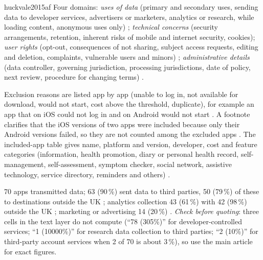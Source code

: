 \begin{papercard}{huckvale2015af}
 Four domains: \emph{uses of data} (primary and secondary uses, sending data to developer services, advertisers or marketers, analytics or research, while loading content, anonymous uses only) ; \emph{technical concerns} (security arrangements, retention, inherent risks of mobile and internet security, cookies); \emph{user rights} (opt-out, consequences of not sharing, subject access requests, editing and deletion, complaints, vulnerable users and minors) ; \emph{administrative details} (data controller, governing jurisdiction, processing jurisdictions, date of policy, next review, procedure for changing terms) .

 Exclusion reasons are listed app by app (unable to log in, not available for download, would not start, cost above the threshold, duplicate), for example an app that on iOS could not log in and on Android would not start . A footnote clarifies that the iOS versions of two apps were included because only their Android versions failed, so they are not counted among the excluded apps . The included-app table gives name, platform and version, developer, cost and feature categories (information, health promotion, diary or personal health record, self-management, self-assessment, symptom checker, social network, assistive technology, service directory, reminders and others) .

 70 apps transmitted data; 63 (90\,\%) sent data to third parties, 50 (79\,\%) of these to destinations outside the UK ; analytics collection 43 (61\,\%) with 42 (98\,\%) outside the UK ; marketing or advertising 14 (20\,\%) . \emph{Check before quoting}: three cells in the text layer do not compute (``78 (305\%)'' for developer-controlled services; ``1 (10000\%)'' for research data collection to third parties; ``2 (10\%)'' for third-party account services when 2 of 70 is about 3\,\%), so use the main article for exact figures.


\end{papercard}
